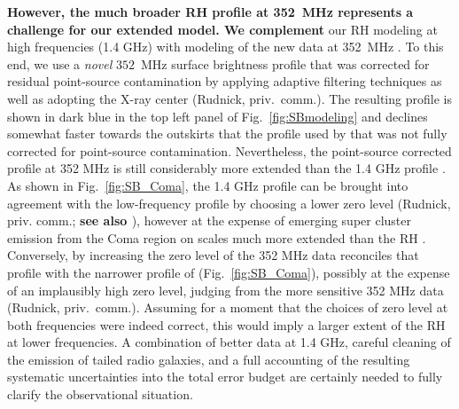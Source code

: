 \documentclass[useAMS,usenatbib]{mn2e}
\begin{document}
{\bf However, the much broader RH profile at 352~MHz represents a challenge for our extended model.
We complement} our RH modeling at high frequencies (1.4 GHz) with modeling of the new data at 
352~MHz \citep{2011MNRAS.412....2B}. To this end, we use a {\em novel} $352$~MHz
surface brightness profile that was corrected for residual point-source
contamination by applying adaptive filtering techniques as well as adopting the
X-ray center (Rudnick, priv.{\ }comm.). The resulting profile is shown in dark
blue in the top left panel of Fig.~\ref{fig:SBmodeling} and declines somewhat
faster towards the outskirts that the profile used by
\citet{2012arXiv1207.3025B} that was not fully corrected for point-source
contamination. Nevertheless, the point-source corrected profile at 352 MHz
\citep{2011MNRAS.412....2B} is still considerably more extended than the 1.4 GHz
profile \citep{1997A&A...321...55D}.  As shown in Fig.~\ref{fig:SB_Coma}, the
1.4 GHz profile can be brought into agreement with the low-frequency profile by
choosing a lower zero level (Rudnick, priv. comm.; {\bf see also \citealp{2012arXiv1208.3611P}}), 
however at the expense of emerging super cluster emission from the Coma region on scales much 
more extended than the RH \citep{2007ApJ...659..267K}. Conversely, by
increasing the zero level of the 352 MHz data \citep{2011MNRAS.412....2B}
reconciles that profile with the narrower profile of \citet{1997A&A...321...55D}
(Fig.~\ref{fig:SB_Coma}), possibly at the expense of an implausibly high zero
level, judging from the more sensitive 352 MHz data (Rudnick, priv.{\ }comm.).
Assuming for a moment that the choices of zero level at both frequencies were
indeed correct, this would imply a larger extent of the RH at lower
frequencies. A combination of better data at 1.4 GHz, careful cleaning of the
emission of tailed radio galaxies, and a full accounting of the resulting
systematic uncertainties into the total error budget are certainly needed to
fully clarify the observational situation.
\end{document}
